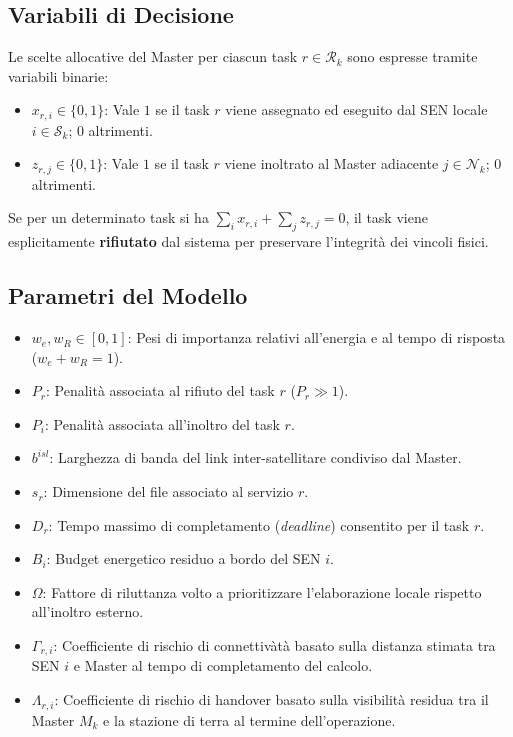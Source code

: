 \documentclass[12pt]{article}
\begin{document}
\subsection{Variabili di Decisione}
Le scelte allocative del Master per ciascun task $r \in \mathcal{R}_k$ sono espresse tramite variabili binarie:
\begin{itemize}
    \item $x_{r,i} \in \{0, 1\}$: Vale $1$ se il task $r$ viene assegnato ed eseguito dal SEN locale $i \in \mathcal{S}_k$; $0$ altrimenti.
    \item $z_{r,j} \in \{0, 1\}$: Vale $1$ se il task $r$ viene inoltrato al Master adiacente $j \in \mathcal{N}_k$; $0$ altrimenti.
\end{itemize}
Se per un determinato task si ha $\sum_{i} x_{r,i} + \sum_{j} z_{r,j} = 0$, il task viene esplicitamente \textbf{rifiutato} dal sistema per preservare l'integrit\`a dei vincoli fisici.

\subsection{Parametri del Modello}
\begin{itemize}
    \item $w_e, w_R \in [0,1]$: Pesi di importanza relativi all'energia e al tempo di risposta ($w_e + w_R = 1$).
    \item $P_r$: Penalit\`a associata al rifiuto del task $r$ ($P_r \gg 1$).
    \item $P_i$: Penalit\`a associata all'inoltro del task $r$.
    \item $b^{isl}$: Larghezza di banda del link inter-satellitare condiviso dal Master.
    \item $s_r$: Dimensione del file associato al servizio $r$.
    \item $D_r$: Tempo massimo di completamento (\textit{deadline}) consentito per il task $r$.
    \item $B_i$: Budget energetico residuo a bordo del SEN $i$.
    \item $\Omega$: Fattore di riluttanza volto a prioritizzare l'elaborazione locale rispetto all'inoltro esterno.
    \item $\Gamma_{r,i}$: Coefficiente di rischio di connettiv\`at\`a basato sulla distanza stimata tra SEN $i$ e Master al tempo di completamento del calcolo.
    \item $\Lambda_{r,i}$: Coefficiente di rischio di handover basato sulla visibilit\`a residua tra il Master $M_k$ e la stazione di terra al termine dell'operazione.
\end{itemize}
\end{document}
